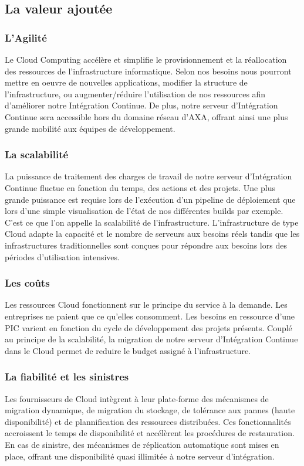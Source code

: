       \subsection{La valeur ajoutée}
        \subsubsection{L'Agilité}
        Le Cloud Computing accélère et simplifie le provisionnement et la réallocation des ressources de l'infrastructure informatique. Selon nos besoins nous pourront mettre en oeuvre de nouvelles applications, modifier la structure de l'infrastructure, ou augmenter/réduire l'utilisation de nos ressources afin d'améliorer notre Intégration Continue. De plus, notre serveur d'Intégration Continue sera accessible hors du domaine réseau d'AXA, offrant ainsi une plus grande mobilité aux équipes de développement.

        \subsubsection{La scalabilité}
        La puissance de traitement des charges de travail de notre serveur d'Intégration Continue fluctue en fonction du temps, des actions et des projets. Une plus grande puissance est requise lors de l'exécution d'un pipeline de déploiement que lors d'une simple visualisation de l'état de nos différentes builds par exemple. C'est ce que l'on appelle la scalabilité de l'infrastructure. L'infrastructure de type Cloud adapte la capacité et le nombre de serveurs aux besoins réels tandis que les infrastructures traditionnelles sont conçues pour répondre aux besoins lors des périodes d'utilisation intensives.

        \subsubsection{Les coûts}
        Les ressources Cloud fonctionnent sur le principe du service à la demande. Les entreprises ne paient que ce qu'elles consomment. Les besoins en ressource d'une PIC varient en fonction du cycle de développement des projets présents. Couplé au principe de la scalabilité, la migration de notre serveur d'Intégration Continue dans le Cloud permet de reduire le budget assigné à l'infrastructure.

        \subsubsection{La fiabilité et les sinistres}
        Les fournisseurs de Cloud intègrent à leur plate-forme des mécanismes de migration dynamique, de migration du stockage, de tolérance aux pannes (haute disponibilité) et de plannification des ressources distribuées. Ces fonctionnalités accroissent le temps de disponibilité et accélèrent les procédures de restauration. En cas de sinistre, des mécanismes de réplication automatique sont mises en place, offrant une disponibilité quasi illimitée à notre serveur d'intégration.

